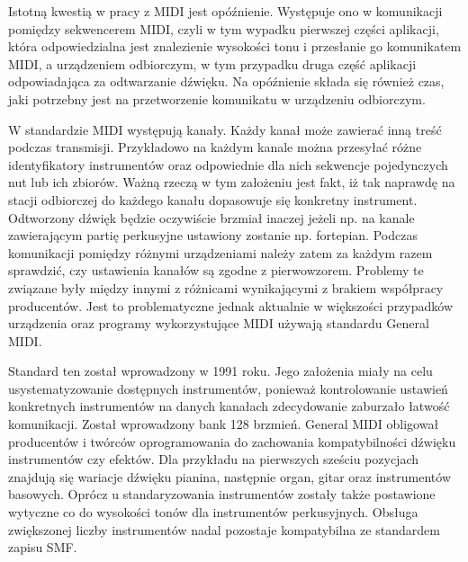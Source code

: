 Istotną kwestią w pracy z  MIDI jest opóźnienie. Występuje ono w komunikacji pomiędzy sekwencerem MIDI, czyli w tym wypadku pierwszej części aplikacji, która odpowiedzialna jest znalezienie wysokości tonu i przesłanie go komunikatem MIDI, a urządzeniem odbiorczym, w tym przypadku druga część aplikacji odpowiadająca za odtwarzanie dźwięku. Na opóźnienie składa się również czas, jaki potrzebny jest na przetworzenie komunikatu w urządzeniu odbiorczym.


W standardzie MIDI występują kanały. Każdy kanał może zawierać inną treść podczas transmisji. Przykładowo na każdym kanale można przesyłać różne identyfikatory instrumentów oraz odpowiednie dla nich sekwencje pojedynczych nut lub ich zbiorów. Ważną rzeczą w tym założeniu jest fakt, iż tak naprawdę na stacji odbiorczej do każdego kanału dopasowuje się konkretny instrument. Odtworzony dźwięk będzie oczywiście brzmiał inaczej jeżeli np. na kanale zawierającym partię perkusyjne ustawiony zostanie np. fortepian. Podczas komunikacji pomiędzy różnymi urządzeniami należy zatem za każdym razem sprawdzić, czy ustawienia kanałów są zgodne z pierwowzorem. Problemy te związane były między innymi z różnicami wynikającymi z brakiem współpracy producentów. Jest to problematyczne jednak aktualnie w większości przypadków urządzenia  oraz programy wykorzystujące MIDI używają standardu General MIDI.


Standard ten został wprowadzony w 1991 roku. Jego założenia miały na celu usystematyzowanie dostępnych instrumentów, ponieważ kontrolowanie ustawień konkretnych instrumentów na danych kanałach zdecydowanie zaburzało łatwość komunikacji. Został wprowadzony bank 128 brzmień. General MIDI obligował producentów i twórców oprogramowania do zachowania kompatybilności dźwięku instrumentów czy efektów. Dla przykładu na pierwszych sześciu pozycjach znajdują się wariacje dźwięku pianina, następnie organ, gitar oraz instrumentów basowych. Oprócz u standaryzowania instrumentów zostały także postawione wytyczne co do wysokości tonów dla instrumentów perkusyjnych. Obsługa zwiększonej liczby instrumentów nadal pozostaje kompatybilna ze standardem zapisu SMF.


